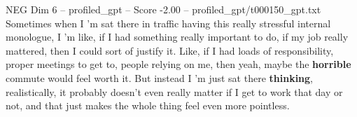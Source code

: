 \begin{textsample}{NEG Dim 6 – profiled\_gpt – Score -2.00 – profiled\_gpt/t000150\_gpt.txt}  \label{ex:f6_neg_014}
Sometimes when I ’m sat there in traffic having this really stressful internal monologue, I ’m like, if I had something really important to do, if my job really mattered, then I could sort of justify it.
Like, if I had loads of responsibility, proper meetings to get to, people relying on me, then yeah, maybe the \textbf{horrible} commute would feel worth it.
But instead I ’m just sat there \textbf{thinking}, realistically, it probably doesn't even really matter if I get to work that day or not, and that just makes the whole thing feel even more pointless.

\end{textsample}
